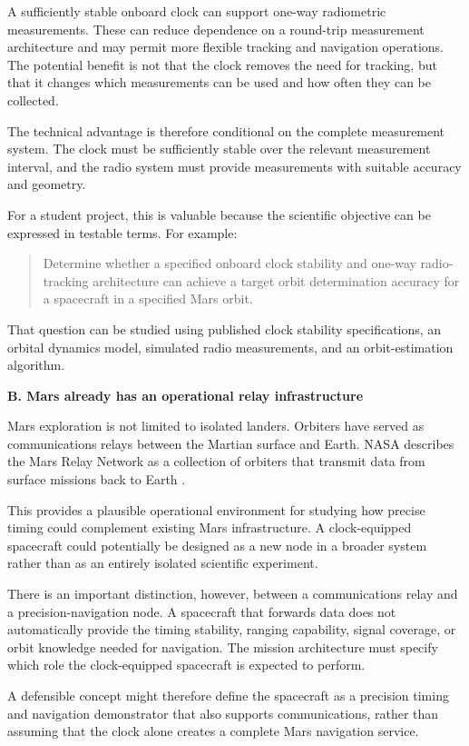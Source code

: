 A sufficiently stable onboard clock can support one-way
radiometric measurements. These can reduce dependence on a
round-trip measurement architecture and may permit more flexible
tracking and navigation operations. The potential benefit is not
that the clock removes the need for tracking, but that it changes
which measurements can be used and how often they can be collected.

The technical advantage is therefore conditional on the complete
measurement system. The clock must be sufficiently stable over the
relevant measurement interval, and the radio system must provide
measurements with suitable accuracy and geometry.

For a student project, this is valuable because the scientific
objective can be expressed in testable terms. For example:

\begin{quote}
	Determine whether a specified onboard clock stability and
	one-way radio-tracking architecture can achieve a target orbit
	determination accuracy for a spacecraft in a specified Mars orbit.
\end{quote}

That question can be studied using published clock stability
specifications, an orbital dynamics model, simulated radio
measurements, and an orbit-estimation algorithm.

\textbf{B. Mars already has an operational relay infrastructure}

Mars exploration is not limited to isolated landers. Orbiters have
served as communications relays between the Martian surface and
Earth. NASA describes the Mars Relay Network as a collection of
orbiters that transmit data from surface missions back to Earth
\cite{MarsRelayNetwork}.

This provides a plausible operational environment for studying
how precise timing could complement existing Mars infrastructure.
A clock-equipped spacecraft could potentially be designed as a
new node in a broader system rather than as an entirely isolated
scientific experiment.

There is an important distinction, however, between a communications
relay and a precision-navigation node. A spacecraft that forwards
data does not automatically provide the timing stability,
ranging capability, signal coverage, or orbit knowledge needed for
navigation. The mission architecture must specify which role the
clock-equipped spacecraft is expected to perform.

A defensible concept might therefore define the spacecraft as
a precision timing and navigation demonstrator that also supports
communications, rather than assuming that the clock alone creates
a complete Mars navigation service.

